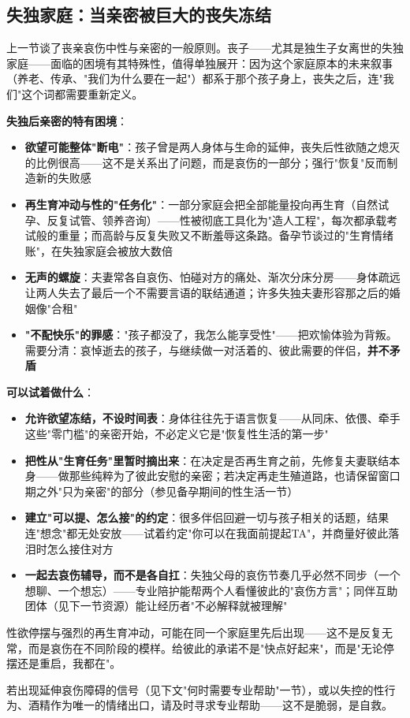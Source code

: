 \subsection{失独家庭：当亲密被巨大的丧失冻结}

上一节谈了丧亲哀伤中性与亲密的一般原则。丧子——尤其是独生子女离世的失独家庭——面临的困境有其特殊性，值得单独展开：因为这个家庭原本的未来叙事（养老、传承、"我们为什么要在一起"）都系于那个孩子身上，丧失之后，连"我们"这个词都需要重新定义。

\vspace{0.5em}
\noindent\textbf{失独后亲密的特有困境}：

\begin{itemize}
	\item \textbf{欲望可能整体"断电"}：孩子曾是两人身体与生命的延伸，丧失后性欲随之熄灭的比例很高——这不是关系出了问题，而是哀伤的一部分；强行"恢复"反而制造新的失败感
	\item \textbf{再生育冲动与性的"任务化"}：一部分家庭会把全部能量投向再生育（自然试孕、反复试管、领养咨询）——性被彻底工具化为"造人工程"，每次都承载考试般的重量；而高龄与反复失败又不断羞辱这条路。备孕节谈过的"生育情绪账"，在失独家庭会被放大数倍
	\item \textbf{无声的螺旋}：夫妻常各自哀伤、怕碰对方的痛处、渐次分床分房——身体疏远让两人失去了最后一个不需要言语的联结通道；许多失独夫妻形容那之后的婚姻像"合租"
	\item \textbf{"不配快乐"的罪感}："孩子都没了，我怎么能享受性"——把欢愉体验为背叛。需要分清：哀悼逝去的孩子，与继续做一对活着的、彼此需要的伴侣，\textbf{并不矛盾}
\end{itemize}

\vspace{0.5em}
\noindent\textbf{可以试着做什么}：

\begin{itemize}
	\item \textbf{允许欲望冻结，不设时间表}：身体往往先于语言恢复——从同床、依偎、牵手这些"零门槛"的亲密开始，不必定义它是"恢复性生活的第一步"
	\item \textbf{把性从"生育任务"里暂时摘出来}：在决定是否再生育之前，先修复夫妻联结本身——做那些纯粹为了彼此安慰的亲密；若决定再走生殖道路，也请保留窗口期之外"只为亲密"的部分（参见备孕期间的性生活一节）
	\item \textbf{建立"可以提、怎么接"的约定}：很多伴侣回避一切与孩子相关的话题，结果连"想念"都无处安放——试着约定"你可以在我面前提起TA"，并商量好彼此落泪时怎么接住对方
	\item \textbf{一起去哀伤辅导，而不是各自扛}：失独父母的哀伤节奏几乎必然不同步（一个想聊、一个想忘）——专业陪护能帮两个人看懂彼此的"哀伤方言"；同伴互助团体（见下一节资源）能让经历者"不必解释就被理解"
\end{itemize}

\begin{tcolorbox}[colback=pink!5!white,colframe=red!50!black,title=贴心小叮咛]
性欲停摆与强烈的再生育冲动，可能在同一个家庭里先后出现——这不是反复无常，而是哀伤在不同阶段的模样。给彼此的承诺不是"快点好起来"，而是"无论停摆还是重启，我都在"。
\end{tcolorbox}

若出现延伸哀伤障碍的信号（见下文"何时需要专业帮助"一节），或以失控的性行为、酒精作为唯一的情绪出口，请及时寻求专业帮助——这不是脆弱，是自救。
